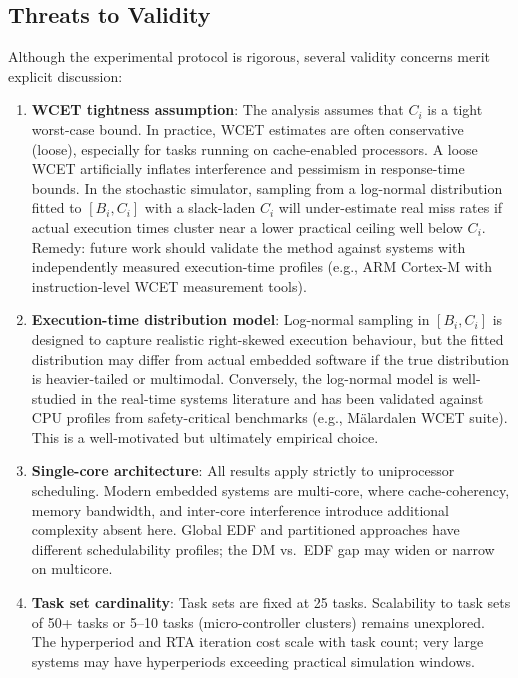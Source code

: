 \documentclass[12pt,a4paper]{article}
\begin{document}
\subsection{Threats to Validity}

Although the experimental protocol is rigorous, several validity concerns merit explicit discussion:

\begin{enumerate}
    \item \textbf{WCET tightness assumption}: The analysis assumes that \(C_i\) is a tight worst-case bound. In practice, WCET estimates are often conservative (loose), especially for tasks running on cache-enabled processors. A loose WCET artificially inflates interference and pessimism in response-time bounds. In the stochastic simulator, sampling from a log-normal distribution fitted to \([B_i, C_i]\) with a slack-laden \(C_i\) will under-estimate real miss rates if actual execution times cluster near a lower practical ceiling well below \(C_i\). Remedy: future work should validate the method against systems with independently measured execution-time profiles (e.g., ARM Cortex-M with instruction-level WCET measurement tools).\vspace{0.2cm}

    \item \textbf{Execution-time distribution model}: Log-normal sampling in \([B_i,C_i]\) is designed to capture realistic right-skewed execution behaviour, but the fitted distribution may differ from actual embedded software if the true distribution is heavier-tailed or multimodal. Conversely, the log-normal model is well-studied in the real-time systems literature and has been validated against CPU profiles from safety-critical benchmarks (e.g., Mälardalen WCET suite). This is a well-motivated but ultimately empirical choice.\vspace{0.2cm}

    \item \textbf{Single-core architecture}: All results apply strictly to uniprocessor scheduling. Modern embedded systems are multi-core, where cache-coherency, memory bandwidth, and inter-core interference introduce additional complexity absent here. Global EDF and partitioned approaches have different schedulability profiles; the DM vs.~EDF gap may widen or narrow on multicore.\vspace{0.2cm}

    \item \textbf{Task set cardinality}: Task sets are fixed at 25 tasks. Scalability to task sets of 50+ tasks or 5--10 tasks (micro-controller clusters) remains unexplored. The hyperperiod and RTA iteration cost scale with task count; very large systems may have hyperperiods exceeding practical simulation windows.\vspace{0.2cm}


\end{enumerate}
\end{document}
